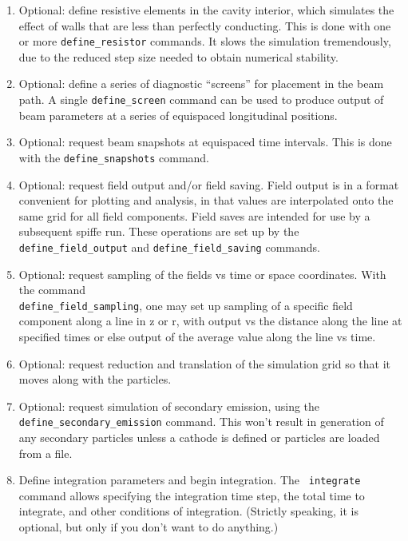 \documentclass[11pt]{article}
\begin{document}
\begin{enumerate}
\item Optional: define resistive elements in the cavity interior,
which simulates the effect of walls that are less than perfectly
conducting.  This is done with one or more {\tt define\_resistor}
commands.  It slows the simulation tremendously, due to the reduced
step size needed to obtain numerical stability.

\item Optional: define a series of diagnostic ``screens'' for placement
in the beam path.  A single {\tt define\_screen} command can be used
to produce output of beam parameters at a series of equispaced
longitudinal positions.

\item Optional: request beam snapshots at equispaced time intervals.
This is done with the {\tt define\_snapshots} command.

\item Optional: request field output and/or field saving.  Field output
is in a format convenient for plotting and analysis, in that values
are interpolated onto the same grid for all field components.  Field
saves are intended for use by a subsequent spiffe run.  These operations
are set up by the {\tt define\_field\_output} and {\tt define\_field\_saving}
commands.

\item Optional: request sampling of the fields vs time or space
coordinates.  With the command\\ {\tt define\_field\_sampling}, one may set up
sampling of a specific field component along a line in z or r, with
output vs the distance along the line at specified times or else
output of the average value along the line vs time.

\item Optional: request reduction and translation of the simulation
grid so that it moves along with the particles.

\item Optional: request simulation of secondary emission, using the
{\tt define\_secondary\_emission} command.  This won't result in 
generation of any secondary particles unless a cathode is defined
or particles are loaded from a file.

\item Define integration parameters and begin integration.  The {\tt
integrate} command allows specifying the integration time step, the
total time to integrate, and other conditions of integration.
(Strictly speaking, it is optional, but only if you don't want to do
anything.)

\end{enumerate}
\end{document}
